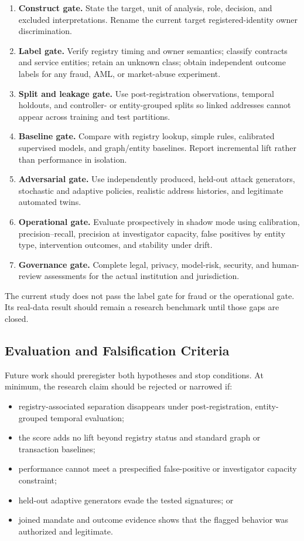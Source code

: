 \begin{enumerate}[leftmargin=*,nosep,label=\textbf{G\arabic*.}]
  \item \textbf{Construct gate.} State the target, unit of analysis, role,
    decision, and excluded interpretations.  Rename the current target
    registered-identity owner discrimination.
  \item \textbf{Label gate.} Verify registry timing and owner semantics; classify
    contracts and service entities; retain an unknown class; obtain independent
    outcome labels for any fraud, AML, or market-abuse experiment.
  \item \textbf{Split and leakage gate.} Use post-registration observations,
    temporal holdouts, and controller- or entity-grouped splits so linked
    addresses cannot appear across training and test partitions.
  \item \textbf{Baseline gate.} Compare with registry lookup, simple rules,
    calibrated supervised models, and graph/entity baselines.  Report
    incremental lift rather than performance in isolation.
  \item \textbf{Adversarial gate.} Use independently produced, held-out attack
    generators, stochastic and adaptive policies, realistic address histories,
    and legitimate automated twins.
  \item \textbf{Operational gate.} Evaluate prospectively in shadow mode using
    calibration, precision--recall, precision at investigator capacity, false
    positives by entity type, intervention outcomes, and stability under drift.
  \item \textbf{Governance gate.} Complete legal, privacy, model-risk, security,
    and human-review assessments for the actual institution and jurisdiction.
\end{enumerate}

The current study does not pass the label gate for fraud or the operational
gate.  Its real-data result should remain a research benchmark until those gaps
are closed.

\subsection{Evaluation and Falsification Criteria}

Future work should preregister both hypotheses and stop conditions.  At minimum,
the research claim should be rejected or narrowed if:
\begin{itemize}[leftmargin=*,nosep]
  \item registry-associated separation disappears under post-registration,
    entity-grouped temporal evaluation;
  \item the score adds no lift beyond registry status and standard graph or
    transaction baselines;
  \item performance cannot meet a prespecified false-positive or investigator
    capacity constraint;
  \item held-out adaptive generators evade the tested signatures; or
  \item joined mandate and outcome evidence shows that the flagged behavior was
    authorized and legitimate.
\end{itemize}

